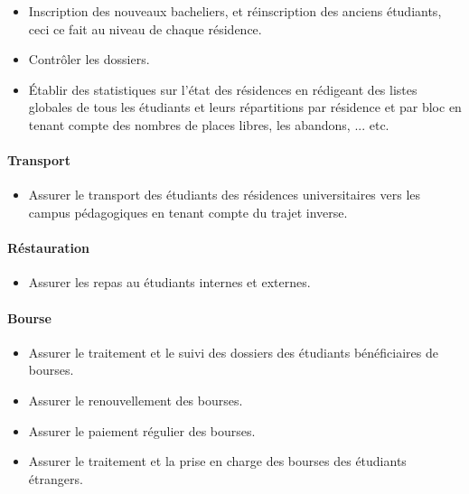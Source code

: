 \begin{itemize}
    \item Inscription des nouveaux bacheliers, et réinscription des anciens étudiants, ceci ce fait au niveau de chaque résidence.
    \item Contrôler les dossiers.
    \item Établir des statistiques sur l'état des résidences en rédigeant des listes globales de tous les étudiants et leurs répartitions par résidence et par bloc en tenant compte des nombres de places libres, les abandons, ... etc.
\end{itemize}

\paragraph{Transport}
\begin{itemize}
    \item Assurer le transport des étudiants des résidences universitaires vers les campus pédagogiques en tenant compte du trajet inverse.
\end{itemize}

\paragraph{Réstauration}
\begin{itemize}
    \item Assurer les repas au étudiants internes et externes.
\end{itemize}

\paragraph{Bourse}
\begin{itemize}
    \item Assurer le traitement et le suivi des dossiers des étudiants bénéficiaires de bourses.
    \item Assurer le renouvellement des bourses.
    \item Assurer le paiement régulier des bourses.
    \item Assurer le traitement et la prise en charge des bourses des étudiants étrangers.\\
\end{itemize}

